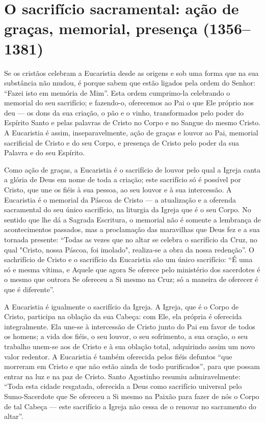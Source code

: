 \section{O sacrifício sacramental: ação de graças, memorial, presença (1356--1381)}

Se os cristãos celebram a Eucaristia desde as origens e sob uma forma que na sua substância não mudou, é porque sabem que estão ligados pela ordem do Senhor: ``Fazei isto em memória de Mim''. Esta ordem cumprimo-la celebrando o memorial do seu sacrifício; e fazendo-o, oferecemos ao Pai o que Ele próprio nos deu --- os dons da sua criação, o pão e o vinho, transformados pelo poder do Espírito Santo e pelas palavras de Cristo no Corpo e no Sangue do mesmo Cristo. A Eucaristia é assim, inseparavelmente, ação de graças e louvor ao Pai, memorial sacrificial de Cristo e do seu Corpo, e presença de Cristo pelo poder da sua Palavra e do seu Espírito.

Como ação de graças, a Eucaristia é o sacrifício de louvor pelo qual a Igreja canta a glória de Deus em nome de toda a criação; este sacrifício só é possível por Cristo, que une os fiéis à sua pessoa, ao seu louvor e à sua intercessão. A Eucaristia é o memorial da Páscoa de Cristo --- a atualização e a oferenda sacramental do seu único sacrifício, na liturgia da Igreja que é o seu Corpo. No sentido que lhe dá a Sagrada Escritura, o memorial não é somente a lembrança de acontecimentos passados, mas a proclamação das maravilhas que Deus fez e a sua tornada presente: ``Todas as vezes que no altar se celebra o sacrifício da Cruz, no qual "Cristo, nossa Páscoa, foi imolado", realiza-se a obra da nossa redenção''. O sachrifício de Cristo e o sacrifício da Eucaristia são um único sacrifício: ``É uma só e mesma vítima, e Aquele que agora Se oferece pelo ministério dos sacerdotes é o mesmo que outrora Se ofereceu a Si mesmo na Cruz; só a maneira de oferecer é que é diferente''.

A Eucaristia é igualmente o sacrifício da Igreja. A Igreja, que é o Corpo de Cristo, participa na oblação da sua Cabeça: com Ele, ela própria é oferecida integralmente. Ela une-se à intercessão de Cristo junto do Pai em favor de todos os homens; a vida dos fiéis, o seu louvor, o seu sofrimento, a sua oração, o seu trabalho unem-se aos de Cristo e à sua oblação total, adquirindo assim um novo valor redentor. A Eucaristia é também oferecida pelos fiéis defuntos ``que morreram em Cristo e que não estão ainda de todo purificados'', para que possam entrar na luz e na paz de Cristo. Santo Agostinho resumiu admiravelmente: ``Toda esta cidade resgatada, oferecida a Deus como sacrifício universal pelo Sumo-Sacerdote que Se ofereceu a Si mesmo na Paixão para fazer de nós o Corpo de tal Cabeça --- este sacrifício a Igreja não cessa de o renovar no sacramento do altar''.

